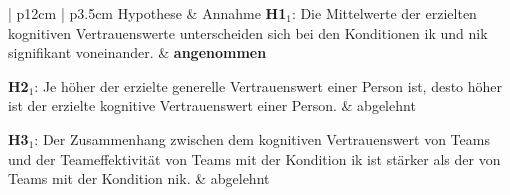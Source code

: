 \documentclass[a4paper,11pt]{article}%
\renewcommand{\\}{\vspace*{0.5\baselineskip} \newline}
\begin{document}
{{\begin{table}[H]
	\centering\footnotesize{}
	\caption[Annahme und Ablehnung der Hypothesen]{Diese Tabelle zeigt, ob eine Hypothese angenommen oder abgelehnt wurde.}
	\label{SignifikanzOverview}
	\begin{tabularx}{\textwidth}{| p{12cm} | p{3.5cm}} 
		Hypothese & Annahme  \\
		\hline \\
\textbf{H1$_{1}$}: Die Mittelwerte der erzielten kognitiven Vertrauenswerte unterscheiden sich bei den Konditionen \ac{ik} und \ac{nik} signifikant voneinander.\\
		& \textbf{angenommen} \\
		\hline \\
		
				\textbf{H2$_{1}$}: Je höher der erzielte generelle Vertrauenswert einer Person ist, desto höher ist der erzielte kognitive Vertrauenswert einer Person. \\
		& abgelehnt \\
		
		\hline 	\\	
%
\textbf{H3$_{1}$}: Der Zusammenhang zwischen dem kognitiven Vertrauenswert von Teams und der Teameffektivität von Teams mit der Kondition \ac{ik} ist stärker als der von Teams mit der Kondition \ac{nik}. \\
		& abgelehnt \\		
		

\end{tabularx}
\end{table}}}
\end{document}
